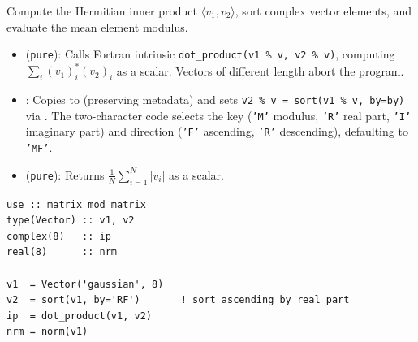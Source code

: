 Compute the Hermitian inner product $\langle v_1, v_2 \rangle$, sort complex vector elements, and evaluate the mean element modulus.

\begin{itemize}
  \item {} (\texttt{pure}): Calls Fortran intrinsic \texttt{dot\_product(v1 \% v, v2 \% v)}, computing $\sum_i (v_1)_i^* (v_2)_i$ as a  scalar. Vectors of different length abort the program.
  \item {}: Copies  to  (preserving metadata) and sets \texttt{v2 \% v = sort(v1 \% v, by=by)} via . The two-character code  selects the key (\texttt{'M'} modulus, \texttt{'R'} real part, \texttt{'I'} imaginary part) and direction (\texttt{'F'} ascending, \texttt{'R'} descending), defaulting to \texttt{'MF'}.
  \item {} (\texttt{pure}): Returns $\frac{1}{N} \sum_{i=1}^{N} |v_i|$ as a  scalar.
\end{itemize}

\begin{description}[leftmargin=2.2cm, style=nextline]
\end{description}

\lstset{language=[95]Fortran}
\begin{lstlisting}
use :: matrix_mod_matrix
type(Vector) :: v1, v2
complex(8)   :: ip
real(8)      :: nrm

v1  = Vector('gaussian', 8)
v2  = sort(v1, by='RF')       ! sort ascending by real part
ip  = dot_product(v1, v2)
nrm = norm(v1)
\end{lstlisting}


